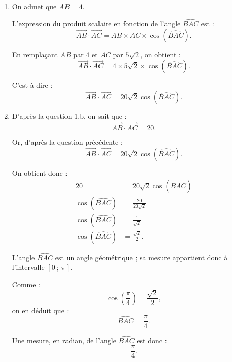 \begin{enumerate}
\begin{enumerate}
Donc :
\[
AC=5\sqrt{2}.
\]

\item On admet que $AB=4$.

L'expression du produit scalaire en fonction de l'angle $\widehat{BAC}$ est :
\[
\overrightarrow{AB}\cdot\overrightarrow{AC}
=AB\times AC\times \cos\left(\widehat{BAC}\right).
\]

En remplaçant $AB$ par $4$ et $AC$ par $5\sqrt{2}$, on obtient :
\[
\overrightarrow{AB}\cdot\overrightarrow{AC}
=4\times 5\sqrt{2}\times \cos\left(\widehat{BAC}\right).
\]

C'est-à-dire :
\[
\overrightarrow{AB}\cdot\overrightarrow{AC}
=20\sqrt{2}\cos\left(\widehat{BAC}\right).
\]

\item D'après la question 1.b, on sait que :
\[
\overrightarrow{AB}\cdot\overrightarrow{AC}=20.
\]

Or, d'après la question précédente :
\[
\overrightarrow{AB}\cdot\overrightarrow{AC}
=20\sqrt{2}\cos\left(\widehat{BAC}\right).
\]

On obtient donc :
\begin{align*}
20&=20\sqrt{2}\cos\left(\widehat{BAC}\right)\\
\cos\left(\widehat{BAC}\right)&=\frac{20}{20\sqrt{2}}\\
\cos\left(\widehat{BAC}\right)&=\frac{1}{\sqrt{2}}\\
\cos\left(\widehat{BAC}\right)&=\frac{\sqrt{2}}{2}.
\end{align*}

L'angle $\widehat{BAC}$ est un angle géométrique ; sa mesure appartient donc à l'intervalle $[0\ ;\ \pi]$.

Comme :
\[
\cos\left(\frac{\pi}{4}\right)=\frac{\sqrt{2}}{2},
\]
on en déduit que :
\[
\widehat{BAC}=\frac{\pi}{4}.
\]

Une mesure, en radian, de l'angle $\widehat{BAC}$ est donc :
\[
\boxed{\frac{\pi}{4}}.
\]
\end{enumerate}
\end{enumerate}

\clearpage
